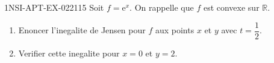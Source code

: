 \begin{exercice}{1NSI-APT-EX-022}{1}{15}
Soit $f = \mathrm{e}^x$. On rappelle que $f$ est convexe sur $\mathbb{R}$.
\begin{enumerate}
  \item Enoncer l'inegalite de Jensen pour $f$ aux points $x$ et $y$ avec $t = \dfrac{1}{2}$.
  \item Verifier cette inegalite pour $x = 0$ et $y = 2$.
\end{enumerate}

\end{exercice}
